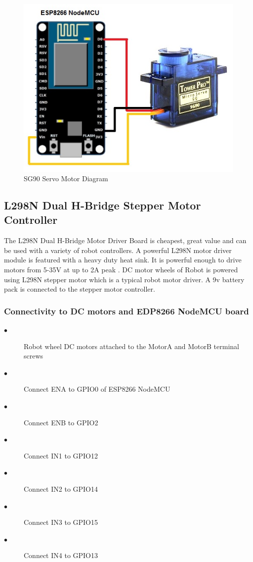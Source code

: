 \documentclass[sigconf]{acmart}
\begin{document}
\begin{figure}
	\includegraphics[width=1.0\columnwidth]{images/SG90-servo.jpg}
	\caption{SG90 Servo Motor Diagram}
\end{figure}

\subsection{L298N Dual H-Bridge Stepper Motor Controller}
The L298N Dual H-Bridge Motor Driver Board is cheapest, great value and can be used with a variety of robot controllers. A powerful L298N motor driver module is featured with a heavy duty heat sink. It is powerful enough to drive motors from 5-35V at up to 2A peak \cite{bananarobotics2013}.
DC motor wheels of Robot is powered using L298N stepper motor which is a typical robot motor driver. A 9v battery pack is connected to the stepper motor controller.

\subsubsection{Connectivity to DC motors and EDP8266 NodeMCU board}
\begin{description}
\item[$\bullet$] Robot wheel DC motors attached to the MotorA and MotorB terminal screws
\item[$\bullet$] Connect ENA to GPIO0 of ESP8266 NodeMCU
\item[$\bullet$] Connect ENB to GPIO2
\item[$\bullet$] Connect IN1 to GPIO12
\item[$\bullet$] Connect IN2 to GPIO14
\item[$\bullet$] Connect IN3 to GPIO15
\item[$\bullet$] Connect IN4 to GPIO13
\end{description}
\end{document}

